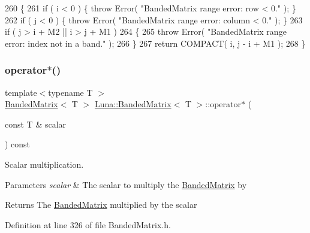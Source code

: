 \begin{DoxyCode}
260   \{
261     \textcolor{keywordflow}{if} ( i < 0 )    \{ \textcolor{keywordflow}{throw} Error( \textcolor{stringliteral}{"BandedMatrix range error: row < 0."} ); \}
262     \textcolor{keywordflow}{if} ( j < 0 )    \{ \textcolor{keywordflow}{throw} Error( \textcolor{stringliteral}{"BandedMatrix range error: column < 0."} ); \}
263     \textcolor{keywordflow}{if} ( j > i + M2 || i > j + M1 )
264     \{
265       \textcolor{keywordflow}{throw} Error( \textcolor{stringliteral}{"BandedMatrix range error: index not in a band."} );
266     \}
267     \textcolor{keywordflow}{return} COMPACT( i, j - i + M1 );
268   \}
\end{DoxyCode}
\mbox{\label{classLuna_1_1BandedMatrix_a7a180b6c7d99e329f9e250977b794a41}} 
\subsubsection{\texorpdfstring{operator$\ast$()}{operator*()}\hspace{0.1cm}{\footnotesize\ttfamily [1/2]}}
{\footnotesize\ttfamily template$<$typename T $>$ \\
\hyperlink{classLuna_1_1BandedMatrix}{Banded\+Matrix}$<$ T $>$ \hyperlink{classLuna_1_1BandedMatrix}{Luna\+::\+Banded\+Matrix}$<$ T $>$\+::operator$\ast$ (\begin{DoxyParamCaption}\item[{const T \&}]{scalar }\end{DoxyParamCaption}) const\hspace{0.3cm}{\ttfamily [inline]}}



Scalar multiplication. 


\begin{DoxyParams}{Parameters}
{\em scalar} & The scalar to multiply the \hyperlink{classLuna_1_1BandedMatrix}{Banded\+Matrix} by \\
\hline
\end{DoxyParams}
\begin{DoxyReturn}{Returns}
The \hyperlink{classLuna_1_1BandedMatrix}{Banded\+Matrix} multiplied by the scalar 
\end{DoxyReturn}


Definition at line 326 of file Banded\+Matrix.\+h.



